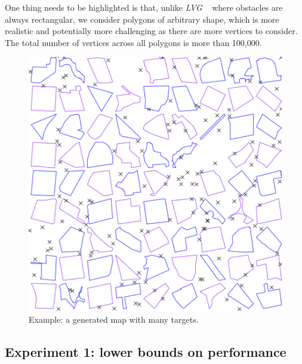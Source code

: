 One thing needs to be highlighted is that, unlike \textit{LVG} ~\cite{zhang2004spatial} where obstacles are always rectangular, we consider polygons of arbitrary shape, which is more realistic and potentially more challenging as there are more vertices to consider. The total number of vertices across all polygons is more than 100,000. 

\begin{figure}[t]
  \centering
  \includegraphics[width=\linewidth]{pic/distribution.png}
  \caption{Example: a generated map with many targets.}\label{distribution}
\end{figure}

\subsection{Experiment 1: lower bounds on performance}

